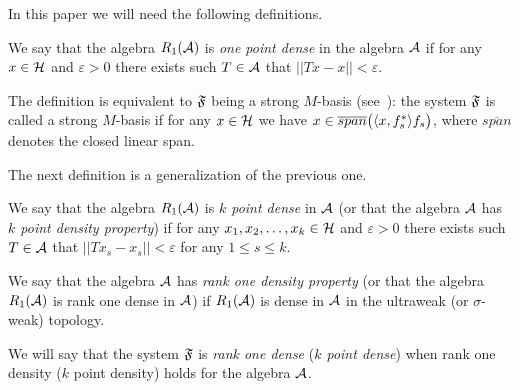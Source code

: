 \documentclass[12pt,oneside,a4paper]{amsart}
\begin{document}
  In this paper we will need the following definitions.
  \begin{definition}
    \label{1pd}
    We say that the algebra $R_1(\cal{A})$ is \emph{one point dense} in the algebra $\cal{A}$ if for any $x \in \cal{H}$ and $\varepsilon > 0$
      there exists such $T\in \cal{A}$ that $||Tx - x|| < \varepsilon$.
  \end{definition}

    The definition is equivalent to $\fsys$ being a strong $M$-basis (see~\cite{katavolos}):
    the system $\fsys$ is called a strong $M$-basis if for any $x\in\cal{H}$ we have $x \in \overline{span}\big(\inner{x}{f^*_s}f_s\big)$, where
      $\overline{span}$ denotes the closed linear span.

  The next definition is a generalization of the previous one.
  \begin{definition}
    \label{kpd}
    We say that the algebra $R_1(\cal{A})$ is \emph{$k$ point dense} in $\cal{A}$ (or that the algebra $\cal{A}$ has
      \emph{$k$ point density property}) if for any $x_1, x_2, \dots, x_k \in \cal{H}$ and $\varepsilon > 0$
      there exists such $T\in \cal{A}$ that $||Tx_s - x_s|| < \varepsilon$ for any $1 \leq s \leq k$.
  \end{definition}

  \begin{definition}
    \label{r1d}
    We say that the algebra $\cal{A}$ has \emph{rank one density property} (or that the algebra $R_1(\cal{A})$
      is rank one dense in $\cal{A}$) if
      $R_1(\cal{A})$ is dense in $\cal{A}$ in the ultraweak (or $\sigma$-weak) topology.
  \end{definition}
  We will say that the system $\fsys$ is \emph{rank one dense} (\emph{$k$ point dense})
    when rank one density ($k$ point density) holds for the algebra $\cal{A}$.

\end{document}
